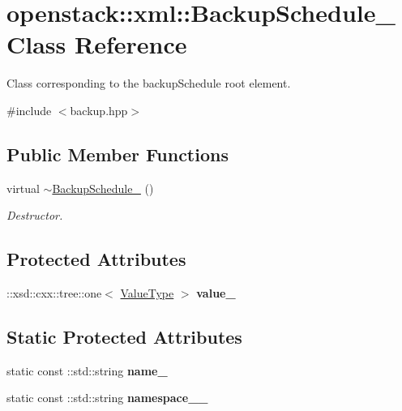 \hypertarget{classopenstack_1_1xml_1_1BackupSchedule__}{
\section{openstack::xml::BackupSchedule\_\- Class Reference}
\label{classopenstack_1_1xml_1_1BackupSchedule__}
}


Class corresponding to the backupSchedule root element.  




{\ttfamily \#include $<$backup.hpp$>$}

\subsection*{Public Member Functions}
\begin{DoxyCompactItemize}
\item 
\hypertarget{classopenstack_1_1xml_1_1BackupSchedule___a6d68ebc312cb1217e1815954fb4d0a27}{
virtual \hyperlink{classopenstack_1_1xml_1_1BackupSchedule___a6d68ebc312cb1217e1815954fb4d0a27}{$\sim$BackupSchedule\_\-} ()}
\label{classopenstack_1_1xml_1_1BackupSchedule___a6d68ebc312cb1217e1815954fb4d0a27}

\begin{DoxyCompactList}\small\item\em Destructor. \item\end{DoxyCompactList}\end{DoxyCompactItemize}
\subsection*{Protected Attributes}
\begin{DoxyCompactItemize}
\item 
\hypertarget{classopenstack_1_1xml_1_1BackupSchedule___acbae6d6fee222ccb49ea66c9d7db73c9}{
::xsd::cxx::tree::one$<$ \hyperlink{classopenstack_1_1xml_1_1BackupSchedule}{ValueType} $>$ {\bfseries value\_\-}}
\label{classopenstack_1_1xml_1_1BackupSchedule___acbae6d6fee222ccb49ea66c9d7db73c9}

\end{DoxyCompactItemize}
\subsection*{Static Protected Attributes}
\begin{DoxyCompactItemize}
\item 
\hypertarget{classopenstack_1_1xml_1_1BackupSchedule___a5e0ebbd8116c4f4006bea266f413c50a}{
static const ::std::string {\bfseries name\_\-}}
\label{classopenstack_1_1xml_1_1BackupSchedule___a5e0ebbd8116c4f4006bea266f413c50a}

\item 
\hypertarget{classopenstack_1_1xml_1_1BackupSchedule___a270a5d592ad8901387f15f0580912ee8}{
static const ::std::string {\bfseries namespace\_\-\_\-}}
\label{classopenstack_1_1xml_1_1BackupSchedule___a270a5d592ad8901387f15f0580912ee8}

\end{DoxyCompactItemize}
